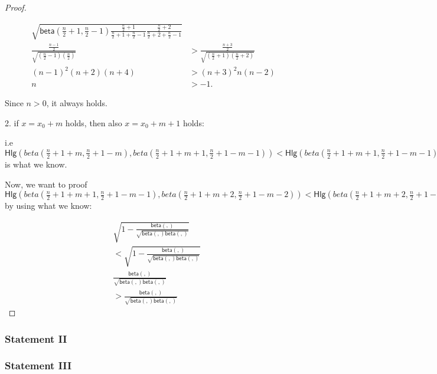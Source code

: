 \documentclass{article}
\begin{document}
\begin{proof}
\begin{mdframed*}
\begin{equation*}
\begin{split}
{\sqrt{\mathsf{beta}(\frac{n}{2} + 1, \frac{n}{2} - 1) \frac{\frac{n}{2} + 1}{\frac{n}{2} + 1 + \frac{n}{2} - 1} \frac{\frac{n}{2} + 2}{\frac{n}{2} + 2 + \frac{n}{2} - 1}}}\\
\frac{\frac{n - 1}{2}}{\sqrt{(\frac{n}{2} - 1)(\frac{n}{2})}}
& > \frac{\frac{n + 3}{2}}{\sqrt{(\frac{n}{2} + 1)(\frac{n}{2} + 2)}}\\
(n - 1) ^ 2 (n + 2)(n + 4)
& > (n + 3) ^ 2 n (n - 2)\\
n & > -1.
\end{split}
\end{equation*}
\end{mdframed*}
Since $n > 0$, it always holds.

2. if $x = x_0 + m$ holds, then also $x = x_0 + m + 1$ holds:

i.e $\mathsf{Hlg}(beta(\frac{n}{2} + 1 + m, \frac{n}{2} + 1 - m), beta(\frac{n}{2} + 1 + m + 1, \frac{n}{2} + 1 - m - 1)) 
< \mathsf{Hlg}(beta(\frac{n}{2} + 1 + m + 1, \frac{n}{2} + 1 - m - 1), beta(\frac{n}{2} + 1 + m + 2, \frac{n}{2} + 1 - m - 2))$
is what we know.

Now, we want to proof $\mathsf{Hlg}(beta(\frac{n}{2} + 1 + m + 1, \frac{n}{2} + 1 - m - 1), beta(\frac{n}{2} + 1 + m + 2, \frac{n}{2} + 1 - m - 2)) 
< \mathsf{Hlg}(beta(\frac{n}{2} + 1 + m + 2, \frac{n}{2} + 1 - m - 2), beta(\frac{n}{2} + 1 + m + 3, \frac{n}{2} + 1 - m - 3))$ by using what we know:

\begin{equation*}
\begin{split}
& \sqrt{1 - \frac{\mathsf{beta}(,)}{\sqrt{\mathsf{beta}(,) \mathsf{beta}(,)}}}\\
& < \sqrt{1 - \frac{\mathsf{beta}(,)}{\sqrt{\mathsf{beta}(,) \mathsf{beta}(,)}}}\\
& \frac{\mathsf{beta}(,)}{\sqrt{\mathsf{beta}(,) \mathsf{beta}(,)}}\\
& > \frac{\mathsf{beta}(,)}{\sqrt{\mathsf{beta}(,) \mathsf{beta}(,)}}
\end{split}
\end{equation*}


\end{proof}

\subsubsection{Statement II}

\subsubsection{Statement III}
\end{document}
